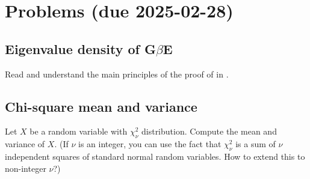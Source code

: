 \documentclass[letterpaper,11pt,oneside,reqno]{article}
\numberwithin{equation}{section}
\theoremstyle{definition}
\begin{document}
\appendix
\setcounter{section}{3}

\section{Problems (due 2025-02-28)}

\subsection{Eigenvalue density of G$\beta$E}

Read and understand the main principles of the
proof of 
in \cite{dumitriu2002matrix}.

\subsection{Chi-square mean and variance}

Let $X$ be a random variable with $\chi^2_\nu$ distribution. Compute the mean and variance of $X$.
(If $\nu$ is an integer, you can use the fact that $\chi^2_\nu$ is a sum of $\nu$ independent squares of standard normal random variables.
How to extend this to non-integer \(\nu\)?)
\end{document}
